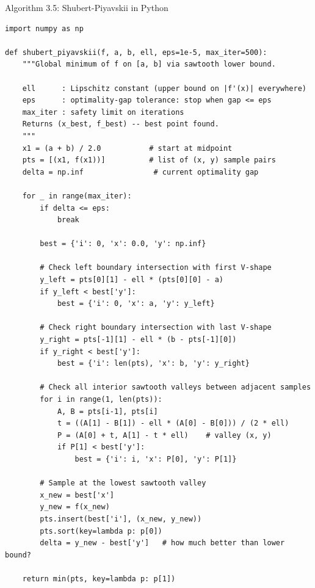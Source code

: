 \documentclass[aspectratio=169,10pt]{beamer}
\begin{document}
\begin{frame}[fragile]{Algorithm 3.5: Shubert-Piyavskii in Python}
\begin{lstlisting}[style=pycode, basicstyle=\ttfamily\tiny,
  caption={Python: Shubert-Piyavskii method (requires Lipschitz constant ell)}]
import numpy as np

def shubert_piyavskii(f, a, b, ell, eps=1e-5, max_iter=500):
    """Global minimum of f on [a, b] via sawtooth lower bound.

    ell      : Lipschitz constant (upper bound on |f'(x)| everywhere)
    eps      : optimality-gap tolerance: stop when gap <= eps
    max_iter : safety limit on iterations
    Returns (x_best, f_best) -- best point found.
    """
    x1 = (a + b) / 2.0           # start at midpoint
    pts = [(x1, f(x1))]          # list of (x, y) sample pairs
    delta = np.inf                # current optimality gap

    for _ in range(max_iter):
        if delta <= eps:
            break

        best = {'i': 0, 'x': 0.0, 'y': np.inf}

        # Check left boundary intersection with first V-shape
        y_left = pts[0][1] - ell * (pts[0][0] - a)
        if y_left < best['y']:
            best = {'i': 0, 'x': a, 'y': y_left}

        # Check right boundary intersection with last V-shape
        y_right = pts[-1][1] - ell * (b - pts[-1][0])
        if y_right < best['y']:
            best = {'i': len(pts), 'x': b, 'y': y_right}

        # Check all interior sawtooth valleys between adjacent samples
        for i in range(1, len(pts)):
            A, B = pts[i-1], pts[i]
            t = ((A[1] - B[1]) - ell * (A[0] - B[0])) / (2 * ell)
            P = (A[0] + t, A[1] - t * ell)    # valley (x, y)
            if P[1] < best['y']:
                best = {'i': i, 'x': P[0], 'y': P[1]}

        # Sample at the lowest sawtooth valley
        x_new = best['x']
        y_new = f(x_new)
        pts.insert(best['i'], (x_new, y_new))
        pts.sort(key=lambda p: p[0])
        delta = y_new - best['y']   # how much better than lower bound?

    return min(pts, key=lambda p: p[1])
\end{lstlisting}
\end{frame}
\end{document}
